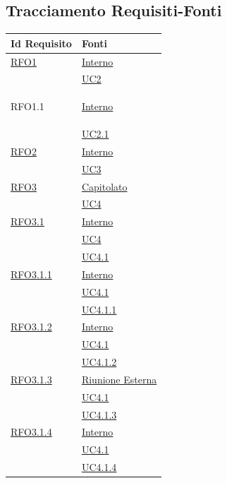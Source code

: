 \subsection{Tracciamento Requisiti-Fonti}
\normalsize
\begin{longtable}{|>{\centering}m{5cm}|m{5cm}<{\centering}|}
\hline 
\textbf{Id Requisito} & \textbf{Fonti}\\
\hline
\endhead
\hyperlink{RFO1}{RFO1} & \hyperlink{Interno}{Interno}\\
& \hyperref[UC2]{UC2}\\ \hline

\hypertarget{RFO1.1}{RFO1.1} & \hyperlink{Interno}{Interno}\\
& \hyperref[UC2.1]{UC2.1}\\ \hline

\hyperlink{RFO2}{RFO2} & \hyperlink{Interno}{Interno}\\
& \hyperref[UC3]{UC3}\\ \hline

\hyperlink{RFO3}{RFO3} & \hyperlink{Capitolato}{Capitolato}\\
& \hyperref[UC4]{UC4}\\ \hline

\hyperlink{RFO3.1}{RFO3.1} & \hyperlink{Interno}{Interno}\\
& \hyperref[UC4]{UC4}\\
& \hyperref[UC4.1]{UC4.1}\\ \hline

\hyperlink{RFO3.1.1}{RFO3.1.1} & \hyperlink{Interno}{Interno}\\
& \hyperref[UC4.1]{UC4.1}\\
& \hyperref[UC4.1.1]{UC4.1.1}\\ \hline

\hyperlink{RFO3.1.2}{RFO3.1.2} & \hyperlink{Interno}{Interno}\\
& \hyperref[UC4.1]{UC4.1}\\
& \hyperref[UC4.1.2]{UC4.1.2}\\ \hline

\hyperlink{RFO3.1.3}{RFO3.1.3} & \hyperlink{Riunione Esterna}{Riunione Esterna}\\
& \hyperref[UC4.1]{UC4.1}\\
& \hyperref[UC4.1.3]{UC4.1.3}\\ \hline

\hyperlink{RFO3.1.4}{RFO3.1.4} & \hyperlink{Interno}{Interno}\\
& \hyperref[UC4.1]{UC4.1}\\
& \hyperref[UC4.1.4]{UC4.1.4}\\ \hline


\end{longtable}
